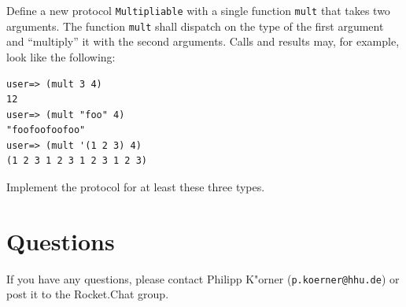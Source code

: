 \documentclass[11pt,a4paper]{article}
\begin{document}
\begin{exercise}

    Define a new protocol \verb|Multipliable| with a single function \verb|mult| that takes two arguments.
    The function \verb|mult| shall dispatch on the type of the first argument
    and ``multiply'' it with the second arguments.
    Calls and results may, for example, look like the following:

\begin{verbatim}
user=> (mult 3 4)
12
user=> (mult "foo" 4)
"foofoofoofoo"
user=> (mult '(1 2 3) 4)
(1 2 3 1 2 3 1 2 3 1 2 3)
\end{verbatim}

    Implement the protocol for at least these three types.
\end{exercise}

%
%
%

	\section*{Questions}
	If you have any questions, please contact Philipp K"orner (\texttt{p.koerner@hhu.de}) or post it to the Rocket.Chat group.
\end{document}
